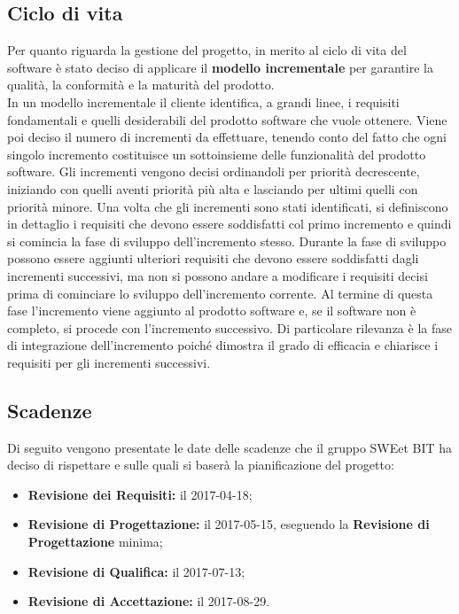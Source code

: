 \subsection{Ciclo di vita}
Per quanto riguarda la gestione del progetto, in merito al ciclo di vita del software è stato deciso di applicare il \textbf{modello incrementale} per garantire la qualità, la conformità e la maturità del prodotto. \\
In un modello incrementale il cliente identifica, a grandi linee, i requisiti fondamentali e quelli desiderabili del prodotto software che vuole ottenere. Viene poi deciso il numero di incrementi da effettuare, tenendo conto del fatto che ogni singolo incremento costituisce un sottoinsieme delle funzionalità del prodotto software. Gli incrementi vengono decisi ordinandoli per priorità decrescente, iniziando con quelli aventi priorità più alta e lasciando per ultimi quelli con priorità minore. Una volta che gli incrementi sono stati identificati, si definiscono in dettaglio i requisiti che devono essere soddisfatti col primo incremento e quindi si comincia la fase di sviluppo dell'incremento stesso. Durante la fase di sviluppo possono essere aggiunti ulteriori requisiti che devono essere soddisfatti dagli incrementi successivi, ma non si possono andare a modificare i requisiti decisi prima di cominciare lo sviluppo dell'incremento corrente. Al termine di questa fase l'incremento viene aggiunto al prodotto software e, se il software non è completo, si procede con l'incremento successivo. Di particolare rilevanza è la fase di integrazione dell'incremento poiché dimostra il grado di efficacia e chiarisce i requisiti per gli incrementi successivi.
\subsection{Scadenze}
Di seguito vengono presentate le date delle scadenze che il gruppo SWEet BIT ha deciso di rispettare e sulle quali si baserà la pianificazione del progetto: \\
\begin{itemize}
	\item \textbf{Revisione dei Requisiti:} il 2017-04-18;
	\item \textbf{Revisione di Progettazione:} il 2017-05-15, eseguendo la \textbf{Revisione di Progettazione} minima;
	\item \textbf{Revisione di Qualifica:} il 2017-07-13;
	\item \textbf{Revisione di Accettazione:} il 2017-08-29.
\end{itemize}
